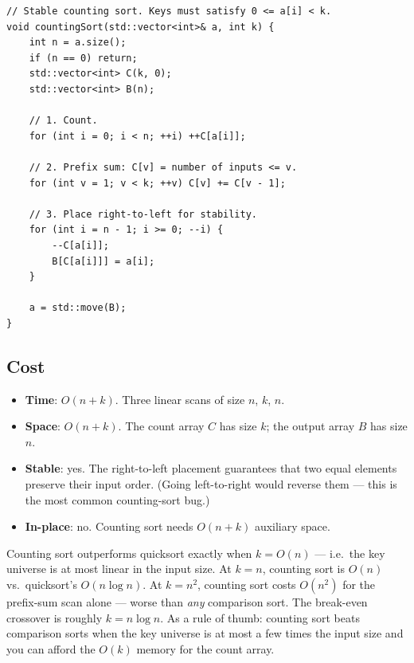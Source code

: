 \documentclass[11pt]{article}
\begin{document}
\begin{lstlisting}[basicstyle=\ttfamily\small,frame=single]
// Stable counting sort. Keys must satisfy 0 <= a[i] < k.
void countingSort(std::vector<int>& a, int k) {
    int n = a.size();
    if (n == 0) return;
    std::vector<int> C(k, 0);
    std::vector<int> B(n);

    // 1. Count.
    for (int i = 0; i < n; ++i) ++C[a[i]];

    // 2. Prefix sum: C[v] = number of inputs <= v.
    for (int v = 1; v < k; ++v) C[v] += C[v - 1];

    // 3. Place right-to-left for stability.
    for (int i = n - 1; i >= 0; --i) {
        --C[a[i]];
        B[C[a[i]]] = a[i];
    }

    a = std::move(B);
}
\end{lstlisting}

\subsection*{Cost}

\begin{itemize}[leftmargin=*]
    \item \textbf{Time}: $O(n + k)$. Three linear scans of size
          $n$, $k$, $n$.
    \item \textbf{Space}: $O(n + k)$. The count array $C$ has
          size $k$; the output array $B$ has size $n$.
    \item \textbf{Stable}: yes. The right-to-left placement
          guarantees that two equal elements preserve their input
          order. (Going left-to-right would reverse them ---
          this is the most common counting-sort bug.)
    \item \textbf{In-place}: no. Counting sort needs $O(n + k)$
          auxiliary space.
\end{itemize}

\begin{ideabox}
Counting sort outperforms quicksort exactly when $k = O(n)$ ---
i.e.\ the key universe is at most linear in the input size. At
$k = n$, counting sort is $O(n)$ vs.\ quicksort's
$O(n \log n)$. At $k = n^2$, counting sort costs $O(n^2)$ for
the prefix-sum scan alone --- worse than \emph{any} comparison
sort. The break-even crossover is roughly $k = n \log n$. As a
rule of thumb: counting sort beats comparison sorts when the key
universe is at most a few times the input size and you can afford
the $O(k)$ memory for the count array.
\end{ideabox}
\end{document}

